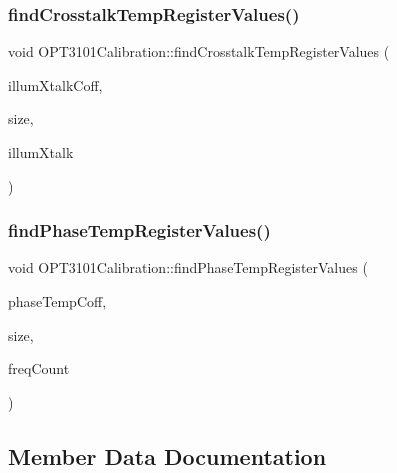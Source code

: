 \subsubsection{\texorpdfstring{find\+Crosstalk\+Temp\+Register\+Values()}{findCrosstalkTempRegisterValues()}}
{\footnotesize\ttfamily void O\+P\+T3101\+Calibration\+::find\+Crosstalk\+Temp\+Register\+Values (\begin{DoxyParamCaption}\item[{\mbox{\hyperlink{class_o_p_t3101_1_1crosstalk_temp_coff_c}{O\+P\+T3101\+::crosstalk\+Temp\+CoffC}} $\ast$}]{illum\+Xtalk\+Coff,  }\item[{uint8\+\_\+t}]{size,  }\item[{\mbox{\hyperlink{class_o_p_t3101_1_1crosstalk_c}{O\+P\+T3101\+::crosstalkC}} $\ast$}]{illum\+Xtalk }\end{DoxyParamCaption})}

\mbox{\label{class_o_p_t3101_calibration_aec7a07b81ddeb24225d9d4b15200302c}} 
\subsubsection{\texorpdfstring{find\+Phase\+Temp\+Register\+Values()}{findPhaseTempRegisterValues()}}
{\footnotesize\ttfamily void O\+P\+T3101\+Calibration\+::find\+Phase\+Temp\+Register\+Values (\begin{DoxyParamCaption}\item[{\mbox{\hyperlink{class_o_p_t3101phase_temp_coff}{O\+P\+T3101phase\+Temp\+Coff}} $\ast$}]{phase\+Temp\+Coff,  }\item[{uint8\+\_\+t}]{size,  }\item[{uint16\+\_\+t}]{freq\+Count }\end{DoxyParamCaption})}



\subsection{Member Data Documentation}
\mbox{\label{class_o_p_t3101_calibration_aeba1794114f60f38656292660120588e}} 
